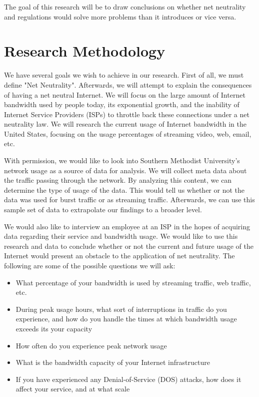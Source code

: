 \documentclass{sigcomm-alternate}
\begin{document}
The goal of this research will be to draw conclusions on whether net neutrality and regulations would solve more problems than it introduces or vice versa.

     		
\section{Research Methodology}
We have several goals we wish to achieve in our research. First of all, we must define "Net Neutrality". Afterwards, we will attempt to explain the consequences of having a net neutral Internet. We will focus on the large amount of Internet bandwidth used by people today, its exponential growth, and the inability of Internet Service Providers (ISPs) to throttle back these connections under a net neutrality law. We will research the current usage of Internet bandwidth in the United States, focusing on the usage percentages of streaming video, web, email, etc. 

With permission, we would like to look into Southern Methodist University's network usage as a source of data for analysis. We will collect meta data about the traffic passing through the network. By analyzing this content, we can determine the type of usage of the data. This would tell us whether or not the data was used for burst traffic or as streaming traffic. Afterwards, we can use this sample set of data to extrapolate our findings to a broader level. 

We would also like to interview an employee at an ISP in the hopes of acquiring data regarding their service and bandwidth usage. We would like to use this research and data to conclude whether or not the current and future usage of the Internet would present an obstacle to the application of net neutrality. The following are some of the possible questions we will ask:

\begin{itemize}
	\item What percentage of your bandwidth is used by streaming traffic, web traffic, etc.
	\item During peak usage hours, what sort of interruptions in traffic do you experience, and how do you handle the times at which bandwidth usage exceeds its your capacity
	\item How often do you experience peak network usage
	\item What is the bandwidth capacity of your Internet infrastructure
	\item If you have experienced any Denial-of-Service (DOS) attacks, how does it affect your service, and at what scale
\end{itemize}
\end{document}

